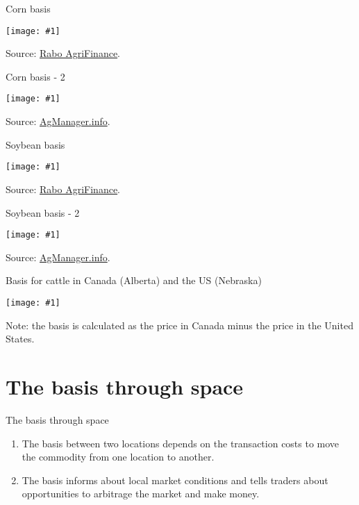 \documentclass[table,xcolor=pdftex,dvipsnames]{beamer}\usepackage[]{graphicx}\usepackage[]{color}
\newcommand {\framedgraphic}[1] {
        \begin{center}
            \texttt{[image: \#1]}
        \end{center}
        \vspace{-1\baselineskip}
}
\begin{document}
\begin{frame}{Corn basis}
    \framedgraphic{Basis_corn.png}
Source: \href{https://www.rabobankamerica.com/agriculture-raf/industy-expertise-and-insights/us-grain-basis-update}{Rabo AgriFinance}.
\end{frame}


\begin{frame}{Corn basis - 2}
    \framedgraphic{Basiscorn201732_1.png}
Source: \href{http://www.agmanager.info/grain-marketing/crop-basis-maps}{AgManager.info}.
\end{frame}



\begin{frame}{Soybean basis}
    \framedgraphic{Basis_soybeans.png}
Source: \href{}{Rabo AgriFinance}.
\end{frame}


\begin{frame}{Soybean basis - 2}
    \framedgraphic{Basisbeans201732_0.png}
Source: \href{http://www.agmanager.info/grain-marketing/crop-basis-maps}{AgManager.info}.
\end{frame}


\begin{frame}{Basis for cattle in Canada (Alberta) and the US (Nebraska)}
    \framedgraphic{Basis_cattle.png}
\scriptsize
Note: the basis is calculated as the price in Canada minus the price in the United States.
\end{frame}



\section{The basis through space}

\begin{frame}{The basis through space}
\begin{enumerate}[label=\textbullet]
    \item The basis between two locations depends on the transaction costs to move the commodity from one location to another.
    \item The basis informs about local market conditions and tells traders about opportunities to arbitrage the market and make money.
\end{enumerate}
\end{frame}
\end{document}
